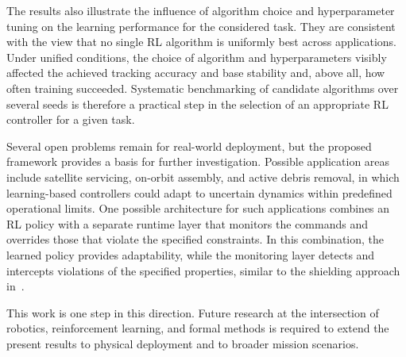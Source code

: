 \documentclass{ieeeaccess}
\begin{document}
The results also illustrate the influence of algorithm choice and hyperparameter tuning on the learning
performance for the considered task. They are consistent with the view that no single RL algorithm
is uniformly best across applications. Under unified conditions, the choice of algorithm and hyperparameters
visibly affected the achieved tracking accuracy and base stability and, above all, how often
training succeeded. Systematic benchmarking of candidate algorithms over several seeds is
therefore a practical step in the selection of an appropriate RL controller for a given task.

Several open problems remain for real-world deployment, but the proposed framework provides a basis
for further investigation. Possible application areas include satellite servicing, on-orbit assembly, and active
debris removal, in which learning-based controllers could adapt to uncertain dynamics within predefined
operational limits. One possible architecture for such applications combines an RL policy with a separate runtime
layer that monitors the commands and overrides those that violate the specified constraints. In this combination,
the learned policy provides adaptability, while the monitoring layer detects and intercepts violations of the
specified properties, similar to the shielding approach in~\cite{b23}.


This work is one step in this direction. Future research at the intersection
of robotics, reinforcement learning, and formal methods is required to extend the present results
to physical deployment and to broader mission scenarios.
\end{document}
